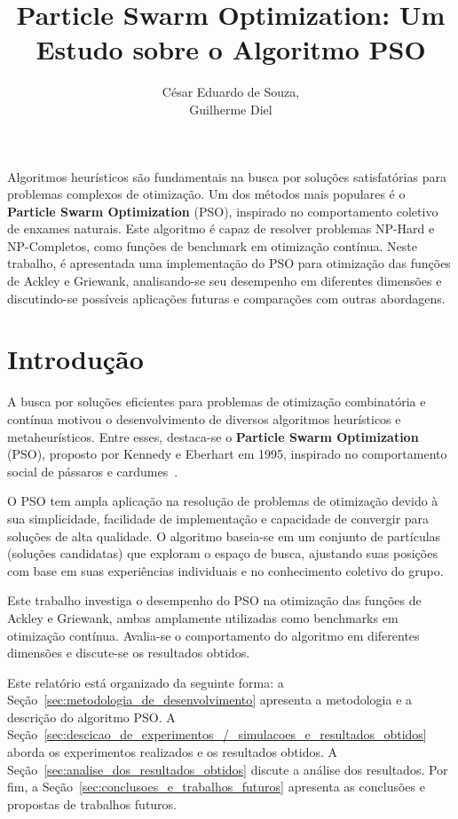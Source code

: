 \documentclass[12pt]{article}
\title{Particle Swarm Optimization: Um Estudo sobre o Algoritmo PSO}
\author{César Eduardo de Souza\inst{1},\\ Guilherme Diel\inst{1}}
\begin{document}
 

\maketitle

\begin{resumo} 
Algoritmos heurísticos são fundamentais na busca por soluções satisfatórias para problemas complexos de otimização. Um dos métodos mais populares é o \textbf{Particle Swarm Optimization} (PSO), inspirado no comportamento coletivo de enxames naturais. Este algoritmo é capaz de resolver problemas NP-Hard e NP-Completos, como funções de benchmark em otimização contínua. Neste trabalho, é apresentada uma implementação do PSO para otimização das funções de Ackley e Griewank, analisando-se seu desempenho em diferentes dimensões e discutindo-se possíveis aplicações futuras e comparações com outras abordagens.
\end{resumo}

\section{Introdução}
\label{sec:introducao}

A busca por soluções eficientes para problemas de otimização combinatória e contínua motivou o desenvolvimento de diversos algoritmos heurísticos e metaheurísticos. Entre esses, destaca-se o \textbf{Particle Swarm Optimization} (PSO), proposto por Kennedy e Eberhart em 1995, inspirado no comportamento social de pássaros e cardumes~\cite{kennedy1995particle}.

O PSO tem ampla aplicação na resolução de problemas de otimização devido à sua simplicidade, facilidade de implementação e capacidade de convergir para soluções de alta qualidade. O algoritmo baseia-se em um conjunto de partículas (soluções candidatas) que exploram o espaço de busca, ajustando suas posições com base em suas experiências individuais e no conhecimento coletivo do grupo.

Este trabalho investiga o desempenho do PSO na otimização das funções de Ackley e Griewank, ambas amplamente utilizadas como benchmarks em otimização contínua. Avalia-se o comportamento do algoritmo em diferentes dimensões e discute-se os resultados obtidos.

Este relatório está organizado da seguinte forma: a Seção~\ref{sec:metodologia_de_desenvolvimento} apresenta a metodologia e a descrição do algoritmo PSO. A Seção~\ref{sec:descicao_de_experimentos_/_simulacoes_e_resultados_obtidos} aborda os experimentos realizados e os resultados obtidos. A Seção~\ref{sec:analise_dos_resultados_obtidos} discute a análise dos resultados. Por fim, a Seção~\ref{sec:conclusoes_e_trabalhos_futuros} apresenta as conclusões e propostas de trabalhos futuros.
\end{document}
